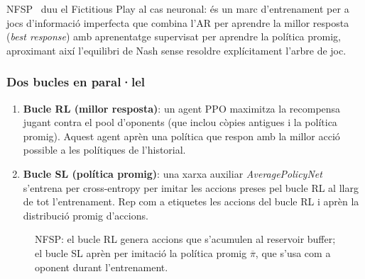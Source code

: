 \ac{NFSP}~\cite{heinrich2016nfsp} duu el Fictitious Play al cas neuronal: és un
marc d'entrenament per a jocs d'informació imperfecta que combina l'\ac{AR} per
aprendre la millor resposta (\emph{best response}) amb aprenentatge supervisat
per aprendre la política promig, aproximant així l'equilibri de Nash sense
resoldre explícitament l'arbre de joc.

\subsubsection*{Dos bucles en paral·lel}

\begin{enumerate}
  \item \textbf{Bucle RL (millor resposta)}: un agent PPO maximitza la
        recompensa jugant contra el pool d'oponents (que inclou còpies antigues
        i la política promig). Aquest agent aprèn una política que
        respon amb la millor acció possible a les polítiques de l'historial.

  \item \textbf{Bucle SL (política promig)}: una xarxa auxiliar
        \emph{AveragePolicyNet} s'entrena per cross-entropy per imitar les
        accions preses pel bucle RL al llarg de tot l'entrenament. Rep com a
        etiquetes les accions del bucle RL i aprèn la distribució promig
        d'accions.
\end{enumerate}

\begin{figure}[H]
  \centering
  \caption{\acs{NFSP}: el bucle RL genera accions que s'acumulen al reservoir buffer; el bucle SL aprèn per imitació la política promig $\overline{\pi}$, que s'usa com a oponent durant l'entrenament.}\label{fig:nfsp}
\end{figure}

